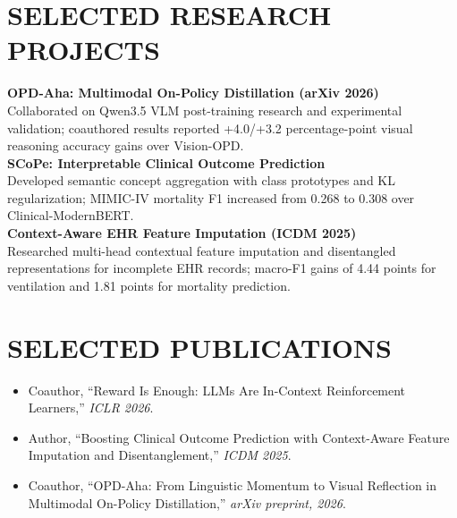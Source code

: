 \documentclass[10pt, letterpaper]{article}
\begin{document}
\section{SELECTED RESEARCH PROJECTS}
\textbf{OPD-Aha: Multimodal On-Policy Distillation (arXiv 2026)}\\[-1pt]
Collaborated on Qwen3.5 VLM post-training research and experimental validation; coauthored results reported +4.0/+3.2 percentage-point visual reasoning accuracy gains over Vision-OPD.\\[3pt]
\textbf{SCoPe: Interpretable Clinical Outcome Prediction}\\[-1pt]
Developed semantic concept aggregation with class prototypes and KL regularization; MIMIC-IV mortality F1 increased from 0.268 to 0.308 over Clinical-ModernBERT.\\[3pt]
\textbf{Context-Aware EHR Feature Imputation (ICDM 2025)}\\[-1pt]
Researched multi-head contextual feature imputation and disentangled representations for incomplete EHR records; macro-F1 gains of 4.44 points for ventilation and 1.81 points for mortality prediction.\\[3pt]
\section{SELECTED PUBLICATIONS}
\begin{itemize}
\item Coauthor, ``Reward Is Enough: LLMs Are In-Context Reinforcement Learners,'' \textit{ICLR 2026}.
\item Author, ``Boosting Clinical Outcome Prediction with Context-Aware Feature Imputation and Disentanglement,'' \textit{ICDM 2025}.
\item Coauthor, ``OPD-Aha: From Linguistic Momentum to Visual Reflection in Multimodal On-Policy Distillation,'' \textit{arXiv preprint, 2026}.
\end{itemize}
\end{document}
